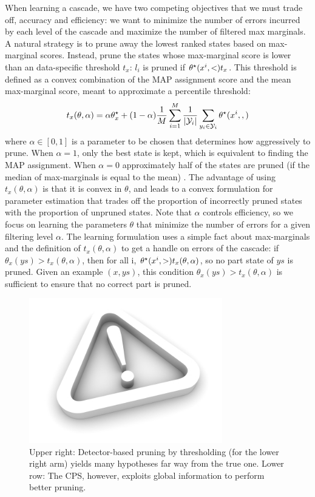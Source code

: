 When learning a cascade, we have two competing objectives that we must trade off,
accuracy and efficiency: we want to minimize the number of errors incurred by each
level of the cascade  and maximize the number of filtered max marginals.  A natural strategy is to prune away the lowest ranked states based on max-marginal scores. Instead, \cite{cascades} prune the states whose max-marginal score is lower than an data-specific threshold $t_x$: $l_i$ is pruned if $\theta^\star(x^i,<) t_x$.  This threshold is defined as a convex combination of the MAP assignment score and the mean max-marginal score, meant to approximate a percentile threshold: $$t_x(\theta,\alpha) = \alpha \theta^\star_x + (1-\alpha)\frac{1}{M}\sum_{i=1}^M\frac{1}{|\mathcal{Y}_i|}\sum_{y_i \in \mathcal{Y}_i} \theta^\star(x^i,,)$$ where $\alpha\in[0,1]$ is a parameter to be chosen that determines how aggressively to prune. When $\alpha = 1$, only the best state is kept, which is equivalent to finding the MAP assignment.  When $\alpha = 0$ approximately half of the states are pruned (if the median of max-marginals is equal to the mean) .  The advantage of using  $t_x(\theta,\alpha)$ is that it is convex in $\theta$, and leads to a convex formulation for parameter estimation that trades off the proportion of incorrectly pruned states with the proportion of unpruned states.
Note that  $\alpha$ controls efficiency, so we focus on learning the parameters $\theta$ that 
minimize the number of errors for a given filtering level $\alpha$.   The learning formulation uses a simple fact about max-marginals and the definition of $t_x(\theta,\alpha)$
to get a handle on errors of the cascade:
if $\theta_x(ys) > t_x(\theta,\alpha)$, then for all i, $\theta^\star(x^i,>)  t_x(\theta,\alpha)$, so no part state of $ys$ is pruned.   Given an example $(x,ys)$,
this condition $\theta_x(ys) > t_x(\theta,\alpha)$ is sufficient to ensure that no correct part is pruned.
\begin{figure}[t]
\begin{center}
\includegraphics[width=0.75\textwidth]{figs/empty.jpg}
\caption[SHORT TITLE]{Upper right: Detector-based pruning by thresholding (for 
the lower right arm) yields many hypotheses far way from the true one. Lower 
row: The CPS, however, exploits global information to perform better pruning.}
\label{fig:cascade_pruning}
\end{center}
\end{figure}

